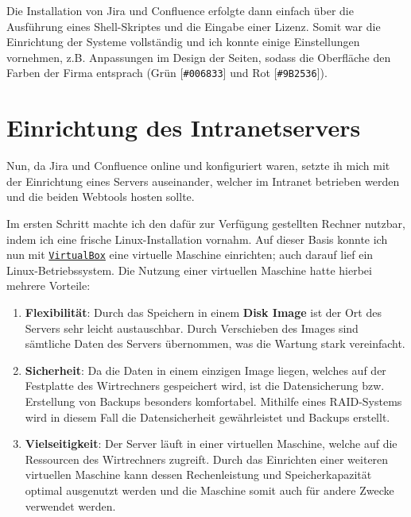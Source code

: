 \documentclass[xcolor=dvipsnames,11pt,paper=a4paper]{report}
\begin{document}
Die Installation von Jira und Confluence erfolgte dann einfach über die Ausführung
eines Shell-Skriptes und die Eingabe einer Lizenz. Somit war die Einrichtung der
Systeme vollständig und ich konnte einige Einstellungen vornehmen, z.B. Anpassungen
im Design der Seiten, sodass die Oberfläche den Farben der Firma entsprach
(\textcolor[HTML]{006833}{Grün [\texttt{\#006833}]} und \textcolor[HTML]{9B2536}{Rot [\texttt{\#9B2536}]}).



\section{Einrichtung des Intranetservers}
\label{sec:jira-server}

Nun, da Jira und Confluence online und konfiguriert waren, setzte ih mich mit der
Einrichtung eines Servers auseinander, welcher im Intranet betrieben werden und
die beiden Webtools hosten sollte.

Im ersten Schritt machte ich den dafür zur Verfügung gestellten Rechner nutzbar,
indem ich eine frische Linux-Installation vornahm. Auf dieser Basis konnte ich nun
mit \href{https://wiki.ubuntuusers.de/VirtualBox/Installation/#VirtualBox-OSE-Open-Source-Edition}{\texttt{VirtualBox}}
eine virtuelle Maschine einrichten; auch darauf lief ein Linux-Betriebssystem. Die
Nutzung einer virtuellen Maschine hatte hierbei mehrere Vorteile:
\begin{enumerate}
	\item \textbf{Flexibilität}:
	Durch das Speichern in einem \textbf{Disk Image} ist der Ort des Servers
	sehr leicht austauschbar. Durch Verschieben des Images sind sämtliche Daten des
	Servers übernommen, was die Wartung stark vereinfacht.
	\item \textbf{Sicherheit}:
	Da die Daten in einem einzigen Image liegen, welches auf der Festplatte des
	Wirtrechners gespeichert wird, ist die Datensicherung bzw. Erstellung von Backups
	besonders komfortabel. Mithilfe eines RAID-Systems wird in diesem Fall die Datensicherheit
	gewährleistet und Backups erstellt.
	\item \textbf{Vielseitigkeit}:
	Der Server läuft in einer virtuellen Maschine, welche auf die Ressourcen
	des Wirtrechners zugreift. Durch das Einrichten einer weiteren virtuellen Maschine
	kann dessen Rechenleistung und Speicherkapazität optimal ausgenutzt werden und
	die Maschine somit auch für andere Zwecke verwendet werden.
\end{enumerate}
\end{document}

